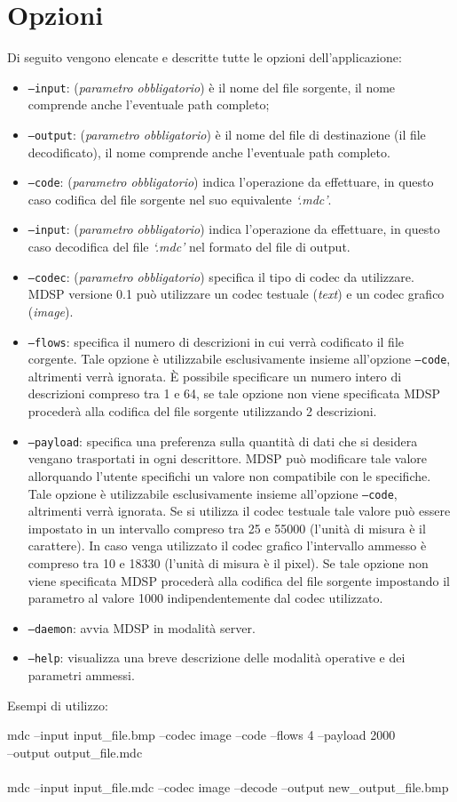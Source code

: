 \section{Opzioni}
\label{sec:opzioni}
Di seguito vengono elencate e descritte tutte le opzioni dell'applicazione:

\begin{itemize}
  \item \texttt{--input}: (\emph{parametro obbligatorio}) è il
  nome del file sorgente, il nome comprende anche l'eventuale path completo;
  \item \texttt{--output}: (\emph{parametro obbligatorio}) è il
  nome del file di destinazione (il file decodificato), il nome comprende anche l'eventuale path
  completo.
  \item \texttt{--code}: (\emph{parametro obbligatorio}) indica
  l'operazione da effettuare, in questo caso codifica del file sorgente nel suo equivalente
  \emph{`.mdc'}.
  \item \texttt{--input}: (\emph{parametro obbligatorio}) indica
  l'operazione da effettuare, in questo caso decodifica del file \emph{`.mdc'}
  nel formato del file di output.
  \item \texttt{--codec}: (\emph{parametro obbligatorio}) specifica il tipo di
  codec da utilizzare. MDSP versione 0.1 può utilizzare un codec testuale (\emph{text})
  e un codec grafico (\emph{image}).
  \item \texttt{--flows}: specifica il numero di descrizioni in cui verrà
  codificato il file corgente. Tale opzione è utilizzabile esclusivamente insieme all'opzione
  \texttt{--code}, altrimenti verrà ignorata. \`E possibile specificare un
  numero intero di descrizioni compreso tra 1 e 64, se tale opzione non viene
  specificata MDSP procederà alla codifica del file sorgente utilizzando 2
  descrizioni.
  \item \texttt{--payload}: specifica una preferenza sulla quantità di dati che
  si desidera vengano trasportati in ogni descrittore. MDSP può modificare tale
  valore allorquando l'utente specifichi un valore non compatibile con le
  specifiche. Tale opzione è utilizzabile esclusivamente insieme all'opzione
  \texttt{--code}, altrimenti verrà ignorata. Se si utilizza il codec testuale
  tale valore può essere impostato in un intervallo compreso tra 25 e 55000
  (l'unità di misura è il carattere). In caso venga utilizzato il codec grafico
  l'intervallo ammesso è compreso tra 10 e 18330 (l'unità di misura è il
  pixel). Se tale opzione non viene specificata MDSP procederà alla codifica
  del file sorgente impostando il parametro al valore 1000 indipendentemente dal codec utilizzato.
  \item \texttt{--daemon}: avvia MDSP in modalità server.
  \item \texttt{--help}: visualizza una breve descrizione delle modalità
  operative e dei parametri ammessi.\\
\end{itemize}

Esempi di utilizzo:

\begin{code}
mdc --input input\_file.bmp --codec image --code --flows 4 --payload
2000\\ --output output\_file.mdc\\\\
mdc --input input\_file.mdc --codec image --decode --output
new\_output\_file.bmp
\end{code}